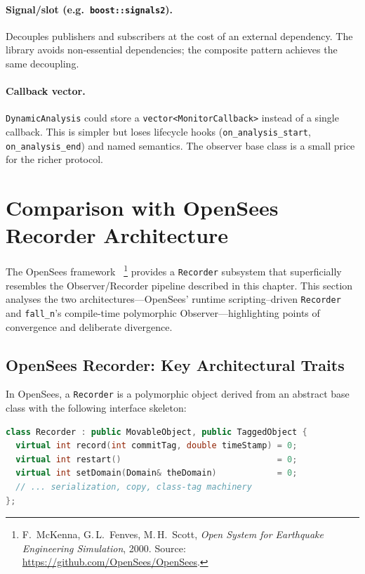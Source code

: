 \paragraph{Signal/slot (e.g.\ \texttt{boost::signals2}).}
Decouples publishers and subscribers at the cost of an external
dependency.  The library avoids non-essential dependencies; the
composite pattern achieves the same decoupling.

\paragraph{Callback vector.}
\texttt{DynamicAnalysis} could store a
\texttt{vector<MonitorCallback>} instead of a single callback.
This is simpler but loses lifecycle hooks (\texttt{on\_analysis\_start},
\texttt{on\_analysis\_end}) and named semantics.  The observer base
class is a small price for the richer protocol.


\section{Comparison with OpenSees Recorder Architecture}
\label{sec:opensees-comparison}

The OpenSees framework~\cite{OpenSees}%
\footnote{F.~McKenna, G.\,L.~Fenves, M.\,H.~Scott, \emph{Open System
for Earthquake Engineering Simulation}, 2000.  Source:
\url{https://github.com/OpenSees/OpenSees}.}
provides a \texttt{Recorder} subsystem that superficially resembles
the Observer/Recorder pipeline described in this chapter.
This section analyses the two architectures---OpenSees' runtime
scripting--driven \texttt{Recorder} and \texttt{fall\_n}'s
compile-time polymorphic Observer---highlighting points of convergence
and deliberate divergence.

\subsection{OpenSees Recorder: Key Architectural Traits}
\label{sec:opensees-recorder}

In OpenSees, a \texttt{Recorder} is a polymorphic object derived from
an abstract base class with the following interface skeleton:

\begin{lstlisting}[language=C++,basicstyle=\small\ttfamily]
class Recorder : public MovableObject, public TaggedObject {
  virtual int record(int commitTag, double timeStamp) = 0;
  virtual int restart()                               = 0;
  virtual int setDomain(Domain& theDomain)            = 0;
  // ... serialization, copy, class-tag machinery
};
\end{lstlisting}

